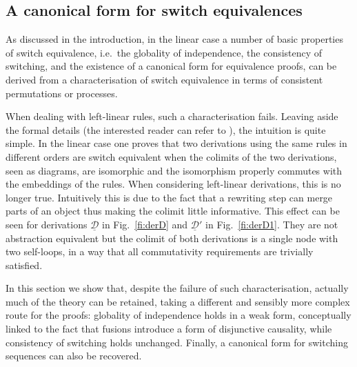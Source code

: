 \documentclass[a4paper,UKenglish,cleveref,pdftex,thm-restate,numberwithinsect]{lipics-v2021}
\newcommand{\cat}[1]{\ensuremath{\mathbf{#1}}}
\newcommand{\dder}[1]{\mathscr{#1}}
\newcommand{\der}[1]{\underline{\dder{#1}}}
\begin{document}
\fi 
\subsection{A canonical form for  switch equivalences}
\label{subsec:canonical}


As discussed in the introduction, in the linear case a number of
basic properties of switch equivalence, i.e.~the globality of
independence, the consistency of switching, and the existence of a
canonical form for equivalence proofs, can be derived from a
characterisation of switch equivalence in terms of consistent
permutations or processes.

When dealing with left-linear rules, such a characterisation
fails. Leaving aside the formal details (the interested reader can
refer to ), the intuition is quite simple. In the
linear case one proves that two derivations using the same rules in
different orders are switch equivalent when the colimits of the two
derivations, seen as diagrams, are isomorphic and the isomorphism
properly commutes with the embeddings of the rules. When considering
left-linear derivations, this is no longer true. Intuitively this is
due to the fact that a rewriting step can merge parts of an
object thus making the colimit little informative.
%
This effect can be seen for derivations $\der{D}$ in
Fig.~\ref{fi:derD} and $\der{D}'$ in Fig.~\ref{fi:derD1}. They are not
abstraction equivalent but the colimit of both derivations is a single node with two self-loops, in a way that  all commutativity requirements are
trivially satisfied.  

In this section we show that, despite the failure of such
characterisation, actually much of the theory can be retained, taking
a different and sensibly more complex route for the proofs: globality
of independence holds in a weak form, conceptually linked to the fact
that fusions introduce a form of disjunctive causality, while
consistency of switching holds unchanged. Finally, a canonical form
for switching sequences can also be recovered.
\end{document}
